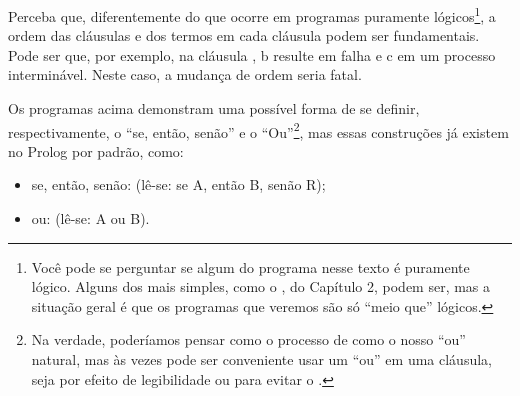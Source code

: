     \begin{listing}
\inputminted{prolog}{../Exemplos/Cap4/prog4_ifthenelse.pl}
    \end{listing}

    \begin{listing}
\inputminted{prolog}{../Exemplos/Cap4/prog5_or.pl}
    \end{listing}

Perceba que, diferentemente do que ocorre em programas puramente lógicos\footnote{Você pode se perguntar se algum do programa nesse texto é puramente lógico. Alguns dos mais simples, como o , do Capítulo 2, %
podem ser, mas a situação geral é que os programas que veremos são só ``meio que'' lógicos.}, a ordem das cláusulas e dos termos em cada cláusula podem ser fundamentais. Pode ser que, por exemplo, na cláusula , b resulte em falha e c em um
processo interminável. Neste caso, a mudança de ordem seria fatal.

Os programas acima demonstram uma possível forma de se definir, respectivamente, o ``se, então, senão'' e o ``Ou''\footnote{Na verdade, poderíamos pensar como o processo de  como o nosso ``ou'' natural, mas às vezes pode ser conveniente usar um ``ou'' em uma cláusula, seja por efeito de legibilidade ou para evitar o .}, mas essas construções já existem no Prolog por padrão, como:

\begin{itemize}
  \item se, então, senão:  (lê-se: se A, então B, senão R);
  \item ou:  (lê-se: A ou B).
\end{itemize}





